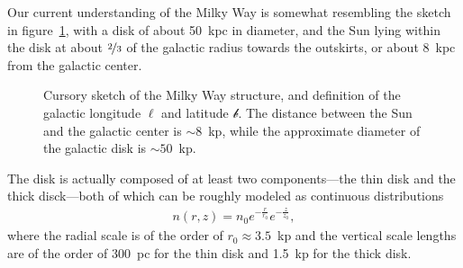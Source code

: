 Our current understanding of the Milky Way is somewhat resembling the sketch in
figure~\ref{fig:milky_way}, with a disk of about 50~kpc in diameter, and the Sun
lying within the disk at about $\nicefrac{2}{3}$ of the galactic radius towards the
outskirts, or about 8~kpc from the galactic center.

\begin{figure}[htbp]
	\caption{Cursory sketch of the Milky Way structure, and definition of the galactic
    longitude $\ell$ and latitude $\mathcal{b}$. The distance between the Sun
    and the galactic center is $\sim 8$~kp, while the approximate diameter of the
    galactic disk is $\sim 50$~kp.}
	\label{fig:milky_way}
\end{figure}

The disk is actually composed of at least two components---the thin disk and the
thick disck---both of which can be roughly modeled as continuous distributions
\begin{align}
	n(r, z) = n_0 e^{-\frac{r}{r_0}} e^{-\frac{z}{z_0}},
\end{align}
where the radial scale is of the order of $r_0 \approx 3.5$~kp and the vertical
scale lengths are of the order of 300~pc for the thin disk and 1.5~kp for the thick
disk.

